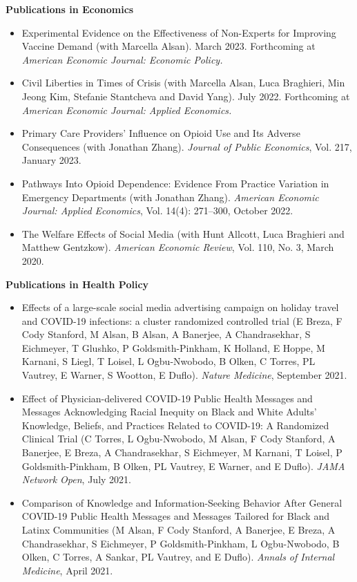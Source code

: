 \documentclass[letterpaper,11pt]{article}
\begin{document}
\begin{normalsize}
\vspace{-0.4cm} 
\textbf{Publications in Economics}
\medskip

\setlength{\parindent}{0pt}
\setlength{\parskip}{0em}

\begin{itemize}[leftmargin=*]
\itemsep0em 
\item Experimental Evidence on the Effectiveness of Non-Experts for Improving Vaccine Demand (with Marcella Alsan). March 2023. Forthcoming at \textit{American Economic Journal: Economic Policy.}
\item Civil Liberties in Times of Crisis (with Marcella Alsan, Luca Braghieri, Min Jeong Kim, Stefanie Stantcheva and David Yang). July 2022. Forthcoming at \textit{American Economic Journal: Applied Economics.}
\item Primary Care Providers’ Influence on Opioid Use and Its Adverse Consequences (with Jonathan Zhang). \textit{Journal of Public Economics}, Vol. 217, January 2023.
\item Pathways Into Opioid Dependence: Evidence From Practice Variation in Emergency Departments (with Jonathan Zhang). \textit{American Economic Journal: Applied Economics}, Vol. 14(4): 271–300, October 2022.
\item The Welfare Effects of Social Media (with Hunt Allcott, Luca Braghieri and Matthew Gentzkow). \textit{American Economic Review}, Vol. 110, No. 3, March 2020. 
\end{itemize}
\bigskip

\textbf{Publications in Health Policy} 
\medskip
\begin{itemize}[leftmargin=*]
\itemsep0em 
\item Effects of a large-scale social media advertising campaign on holiday travel and COVID-19 infections: a cluster randomized controlled trial (E Breza, F Cody Stanford, M Alsan, B Alsan, A Banerjee, A Chandrasekhar, S Eichmeyer, T Glushko, P Goldsmith-Pinkham, K Holland, E Hoppe, M Karnani, S Liegl, T Loisel, L Ogbu-Nwobodo, B Olken, C Torres, PL Vautrey, E Warner, S Wootton, E Duflo).  \textit{Nature Medicine}, September 2021.
\item Effect of Physician-delivered COVID-19 Public Health Messages and Messages Acknowledging Racial Inequity on Black and White Adults' Knowledge, Beliefs, and Practices Related to COVID-19: A Randomized Clinical Trial (C Torres, L Ogbu-Nwobodo, M Alsan, F Cody Stanford, A Banerjee, E Breza, A Chandrasekhar, S Eichmeyer, M Karnani, T Loisel, P Goldsmith-Pinkham, B Olken, PL Vautrey, E Warner, and E Duflo).   \textit{JAMA Network Open}, July 2021. 
\item Comparison of Knowledge and Information-Seeking Behavior After General COVID-19 Public Health Messages and Messages Tailored for Black and Latinx Communities (M Alsan, F Cody Stanford, A Banerjee, E Breza, A Chandrasekhar, S Eichmeyer, P Goldsmith-Pinkham, L Ogbu-Nwobodo, B Olken, C Torres, A Sankar, PL Vautrey, and E Duflo).  \textit{Annals of Internal Medicine}, April 2021. 
\end{itemize}


\end{normalsize}
\end{document}
